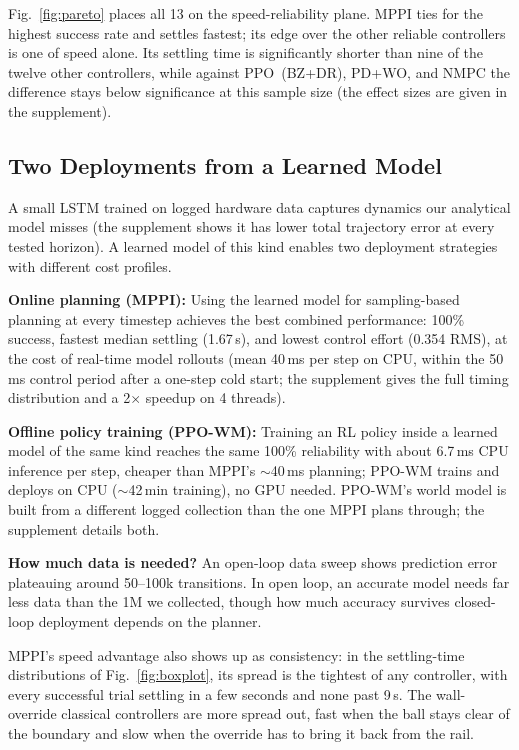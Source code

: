 Fig.~\ref{fig:pareto} places all 13 on the speed-reliability plane.
MPPI ties for the highest success rate and settles fastest; its edge over the other reliable controllers is one of speed alone.
Its settling time is significantly shorter than nine of the twelve other controllers, while against PPO~(BZ+DR), PD+WO, and NMPC the difference stays below significance at this sample size (the effect sizes are given in the supplement).

\subsection{Two Deployments from a Learned Model}

A small LSTM trained on logged hardware data captures dynamics our analytical model misses (the supplement shows it has lower total trajectory error at every tested horizon).
A learned model of this kind enables two deployment strategies with different cost profiles.

\noindent\textbf{Online planning (MPPI):} Using the learned model for sampling-based planning at every timestep achieves the best combined performance: 100\% success, fastest median settling (1.67\,s), and lowest control effort (0.354 RMS), at the cost of real-time model rollouts (mean 40\,ms per step on CPU, within the 50\,ms control period after a one-step cold start; the supplement gives the full timing distribution and a 2$\times$ speedup on 4 threads).

\noindent\textbf{Offline policy training (PPO-WM):} Training an RL policy inside a learned model of the same kind reaches the same 100\% reliability with about 6.7\,ms CPU inference per step, cheaper than MPPI's $\sim$40\,ms planning; PPO-WM trains and deploys on CPU ($\sim$42\,min training), no GPU needed.
PPO-WM's world model is built from a different logged collection than the one MPPI plans through; the supplement details both.

\noindent\textbf{How much data is needed?} An open-loop data sweep shows prediction error plateauing around 50--100k transitions.
In open loop, an accurate model needs far less data than the 1M we collected, though how much accuracy survives closed-loop deployment depends on the planner.

MPPI's speed advantage also shows up as consistency: in the settling-time distributions of Fig.~\ref{fig:boxplot}, its spread is the tightest of any controller, with every successful trial settling in a few seconds and none past 9\,s.
The wall-override classical controllers are more spread out, fast when the ball stays clear of the boundary and slow when the override has to bring it back from the rail.

